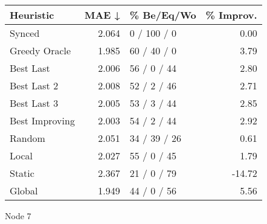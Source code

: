 \begin{tabular}{lrlr}
\toprule
\textbf{Heuristic} & \textbf{MAE ↓} & \textbf{\% Be/Eq/Wo} & \textbf{\% Improv.} \\
\midrule
            Synced &          2.064 &          0 / 100 / 0 &                0.00 \\
     Greedy Oracle &          1.985 &          60 / 40 / 0 &                3.79 \\
         Best Last &          2.006 &          56 / 0 / 44 &                2.80 \\
       Best Last 2 &          2.008 &          52 / 2 / 46 &                2.71 \\
       Best Last 3 &          2.005 &          53 / 3 / 44 &                2.85 \\
    Best Improving &          2.003 &          54 / 2 / 44 &                2.92 \\
            Random &          2.051 &         34 / 39 / 26 &                0.61 \\
             Local &          2.027 &          55 / 0 / 45 &                1.79 \\
            Static &          2.367 &          21 / 0 / 79 &              -14.72 \\
            Global &          1.949 &          44 / 0 / 56 &                5.56 \\
\bottomrule
\end{tabular}
\caption{Node 7}
\label{tab:ds_non_lr01_le1_bs2_7}
